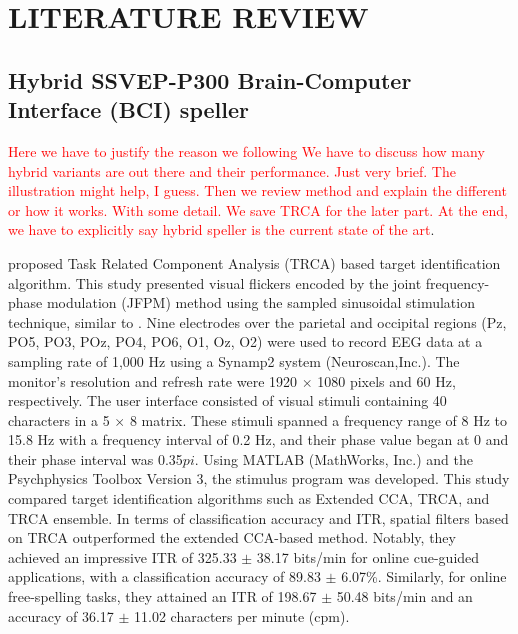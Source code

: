\setlength{\footskip}{8mm}

\chapter{LITERATURE REVIEW}


\section{Hybrid SSVEP-P300 Brain-Computer Interface (BCI) speller}

\textcolor{red}{Here we have to justify the reason we following \cite{xu2020implementing}}
\textcolor{red}{We have to discuss how many hybrid variants are out there and their performance. Just very brief. The illustration might help, I guess. } 
\textcolor{red}{Then we review \cite{xu2020implementing} method and explain the different or how it works. With some detail. We save TRCA for the later part.}
\textcolor{red}{At the end, we have to explicitly say \cite{xu2020implementing} hybrid speller is the current state of the art}. 

\cite{nakanishi2017enhancing} proposed Task Related Component Analysis (TRCA) based target identification algorithm. This study presented visual flickers encoded by the joint frequency-phase modulation (JFPM) method using the sampled sinusoidal stimulation technique, similar to  \cite{chen2014high}. Nine electrodes over the parietal and occipital regions (Pz, PO5, PO3, POz, PO4, PO6, O1, Oz, O2) were used to record EEG data at a sampling rate of 1,000 Hz using a Synamp2 system (Neuroscan,Inc.). The monitor's resolution and refresh rate were 1920 $\times$ 1080 pixels and 60 Hz, respectively. The user interface consisted of visual stimuli containing 40 characters in a 5 $\times$ 8 matrix. These stimuli spanned a frequency range of 8 Hz to 15.8 Hz with a frequency interval of 0.2 Hz, and their phase value began at 0 and their phase interval was 0.35$pi$. Using MATLAB (MathWorks, Inc.) and the Psychphysics Toolbox Version 3, the stimulus program was developed. This study compared target identification algorithms such as Extended CCA, TRCA, and TRCA ensemble. In terms of classification accuracy and ITR, spatial filters based on TRCA outperformed the extended CCA-based method. Notably, they achieved an impressive ITR of 325.33 $\pm$ 38.17 bits/min for online cue-guided applications, with a classification accuracy of 89.83 $\pm$ 6.07\%. Similarly, for online free-spelling tasks, they attained an ITR of 198.67 $\pm$ 50.48 bits/min and an accuracy of 36.17 $\pm$ 11.02 characters per minute (cpm). 

